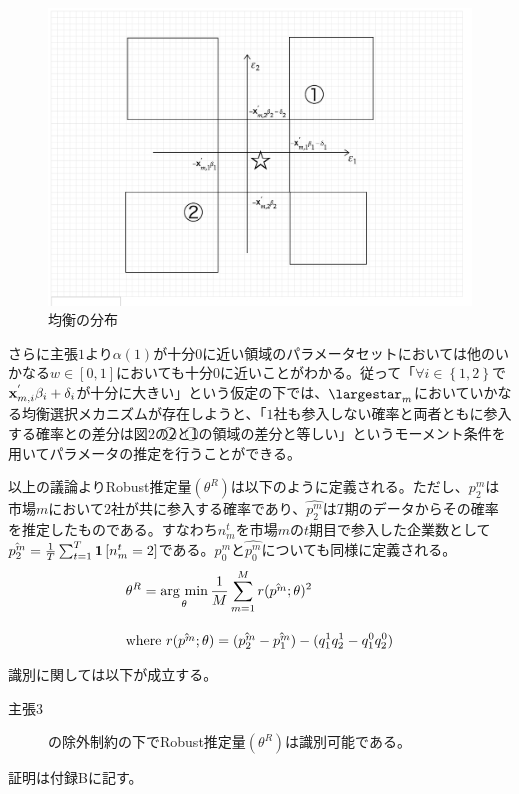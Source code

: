 \begin{figure}[t]
\centering
\includegraphics[scale = 0.3]{brgraph.png}
\caption{均衡の分布}
\end{figure}

さらに主張$1$より$\alpha(1)$が十分$0$に近い領域のパラメータセットにおいては他のいかなる$w \in [0,1]$においても十分$0$に近いことがわかる。従って「$\forall i \in \left\{ 1,2\right\}$で${\bf x}_{m, i}^{'} \beta_i + \delta_i$が十分に大きい」という仮定の下では、$\largestar_m$においていかなる均衡選択メカニズムが存在しようと、「$1$社も参入しない確率と両者ともに参入する確率との差分は図$2$の\textcircled{\scriptsize 2}と\textcircled{\scriptsize 1}の領域の差分と等しい」というモーメント条件を用いてパラメータの推定を行うことができる。

以上の議論よりRobust推定量$(\theta^R)$は以下のように定義される。ただし、$p_2^m$は市場$m$において$2$社が共に参入する確率であり、$\hat{p_2^m}$は$T$期のデータからその確率を推定したものである。すなわち$n_m^t$を市場$m$の$t$期目で参入した企業数として$\hat{p_2^m} = \frac{1}{T} \sum_{t = 1}^T {\bf 1}\left[ n_m^t = 2 \right]$である。$p_0^m$と$\hat{p_0^m}$についても同様に定義される。
\begin{align*}
	&\theta^R = \mathop{\rm arg~min}\limits_{\theta} \frac{1}{M} \sum_{m = 1}^M r(\hat{p^m} ; \theta)^2\\[10pt]
	&\text{where}\ r(\hat{p^m} ; \theta) = (\hat{p_2^m} - \hat{p_1^m}) - (q_1^1 q_2^1 - q_1^0 q_2^0)
\end{align*}

識別に関しては以下が成立する。
\begin{description}
	\item[主張3] \cite{Tamer2003a}の除外制約の下でRobust推定量$(\theta^R)$は識別可能である。
\end{description}
証明は付録Bに記す。

